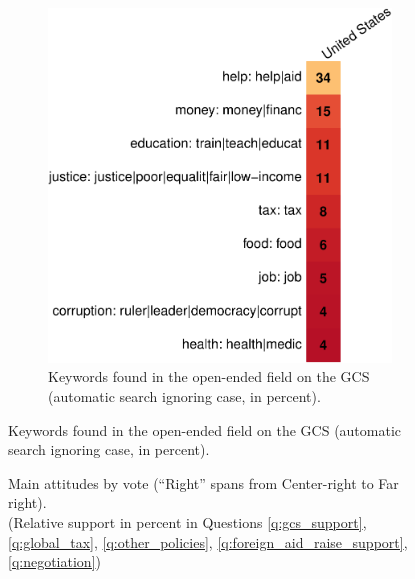 \documentclass[12pt,english]{article}
\begin{document}
\begin{figure}[h!]
\begin{subfigure}{.34\textwidth}
    \end{subfigure}
    \hspace{.02\textwidth}
    \begin{subfigure}{.64\textwidth}
        \caption{Keywords found in the open-ended field on the GCS (automatic search ignoring case, in percent).}
        \includegraphics[width=\textwidth]{../figures/country_comparison/poverty_field_contains_positive.pdf}    
    \end{subfigure}
    \end{figure}


\begin{figure}[h!] 
    \caption[Main attitudes by vote]{Main attitudes by vote (``Right'' spans from Center-right to Far right). \\ (Relative support in percent in Questions \ref{q:gcs_support}, \ref{q:global_tax}, \ref{q:other_policies}, \ref{q:foreign_aid_raise_support}, \ref{q:negotiation})}\label{fig:main_by_vote}
\end{figure}
\end{document}
